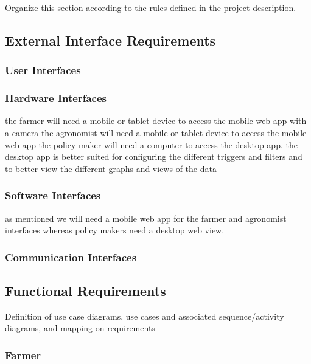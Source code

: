 Organize this section according to the rules defined in the project description. 
\subsection{External Interface Requirements}



\subsubsection{User Interfaces}
\subsubsection{Hardware Interfaces}
the farmer will need a mobile or tablet device to access the mobile web app with a camera 
the agronomist will need a mobile or tablet device to access the mobile web app 
the policy maker will need a computer to access the desktop app. the desktop app is better suited for configuring the different triggers and filters and to better view the different graphs and views of the data

\subsubsection{Software Interfaces}
as mentioned we will need a mobile web app for the farmer and agronomist interfaces whereas policy makers need a desktop web view. 
\subsubsection{Communication Interfaces}
\subsection{Functional Requirements}
Definition of use case diagrams, use cases and associated sequence/activity diagrams, and mapping on requirements

\setcounter{usecase_counter}{1}



\subsubsection{Farmer}









